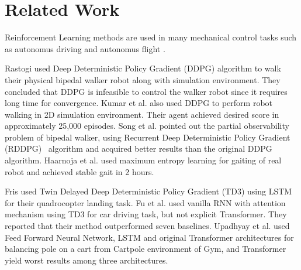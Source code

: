 \section{Related Work}
\label{sec:related_work}

Reinforcement Learning methods are used in many mechanical control tasks 
such as autonomus driving \cite{pan_virtual_2017, shalev-shwartz_safe_2016, sallab_deep_2017, wang_deep_2019} 
and autonomus flight \cite{kopsa_reinforcement_2018, abbeel_application_2006, santos_experimental_2012}.

Rastogi \cite{rastogi_deep_2017} used Deep Deterministic Policy Gradient (DDPG) algorithm to walk 
their physical bipedal walker robot along with simulation environment. 
They concluded that DDPG is infeasible to control the walker robot 
since it requires long time for convergence. 
Kumar et al. \cite{kumar_bipedal_2018} also used DDPG to perform 
robot walking in 2D simulation environment. 
Their agent achieved desired score in approximately 25,000 episodes. 
Song et al. \cite{song_recurrent_2018} pointed out the partial observability problem of bipedal walker, 
using Recurrent Deep Deterministic Policy Gradient (RDDPG)~\cite{heess_memory-based_2015} algorithm 
and acquired better results than the original DDPG algorithm. 
Haarnoja et al. \cite{haarnoja_learning_2019} used maximum entropy learning for gaiting of real robot and achieved stable gait in 2 hours. 

Fris \cite{fris_landing_2020} used Twin Delayed Deep Deterministic Policy Gradient (TD3) 
using LSTM for their quadrocopter landing task. 
Fu et al. \cite{fu_when_2020} used vanilla RNN with attention mechanism 
using TD3 for car driving task, but not explicit Transformer. 
They reported that their method outperformed seven baselines. 
Upadhyay et al. \cite{upadhyay_transformer_2019} used Feed Forward Neural Network, 
LSTM and original Transformer architectures for balancing pole 
on a cart from Cartpole environment of Gym, and Transformer yield worst results among three architectures.
